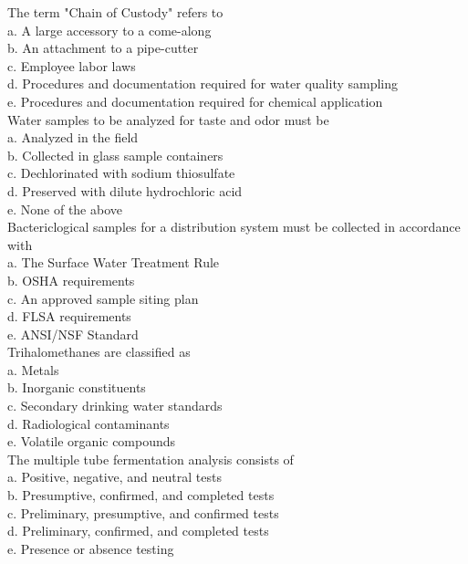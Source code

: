 The term "Chain of Custody" refers to\\
a. A large accessory to a come-along\\
b. An attachment to a pipe-cutter\\
c. Employee labor laws\\
d. Procedures and documentation required for water quality sampling\\
e. Procedures and documentation required for chemical application\\

Water samples to be analyzed for taste and odor must be\\
a. Analyzed in the field\\
b. Collected in glass sample containers\\
c. Dechlorinated with sodium thiosulfate\\
d. Preserved with dilute hydrochloric acid\\
e. None of the above\\

Bactericlogical samples for a distribution system must be collected in accordance with\\
a. The Surface Water Treatment Rule\\
b. OSHA requirements\\
c. An approved sample siting plan\\
d. FLSA requirements\\
e. ANSI/NSF Standard \\

Trihalomethanes are classified as\\
a. Metals\\
b. Inorganic constituents\\
c. Secondary drinking water standards\\
d. Radiological contaminants\\
e. Volatile organic compounds\\

The multiple tube fermentation analysis consists of\\
a. Positive, negative, and neutral tests\\
b. Presumptive, confirmed, and completed tests\\
c. Preliminary, presumptive, and confirmed tests\\
d. Preliminary, confirmed, and completed tests\\
e. Presence or absence testing \\

